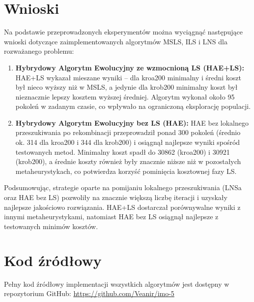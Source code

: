 \documentclass[12pt,a4paper]{article}
\begin{document}
\section{Wnioski}
Na podstawie przeprowadzonych eksperymentów można wyciągnąć następujące wnioski dotyczące zaimplementowanych algorytmów MSLS, ILS i LNS dla rozważanego problemu:

\begin{enumerate}
    \item \textbf{Hybrydowy Algorytm Ewolucyjny ze wzmocnioną LS (HAE+LS):} HAE+LS wykazał mieszane wyniki – dla kroa200 minimalny i średni koszt był nieco wyższy niż w MSLS, a jedynie dla krob200 minimalny koszt był nieznacznie lepszy kosztem wyższej średniej. Algorytm wykonał około 95 pokoleń w zadanym czasie, co wpływało na ograniczoną eksplorację populacji.
    \item \textbf{Hybrydowy Algorytm Ewolucyjny bez LS (HAE):} HAE bez lokalnego przeszukiwania po rekombinacji przeprowadził ponad 300 pokoleń (średnio ok. 314 dla kroa200 i 344 dla krob200) i osiągnął najlepsze wyniki spośród testowanych metod. Minimalny koszt spadł do 30862 (kroa200) i 30921 (krob200), a średnie koszty również były znacznie niższe niż w pozostałych metaheurystykach, co potwierdza korzyść pominięcia kosztownej fazy LS.
\end{enumerate}

Podsumowując, strategie oparte na pomijaniu lokalnego przeszukiwania (LNSa oraz HAE bez LS) pozwoliły na znacznie większą liczbę iteracji i uzyskały najlepsze jakościowo rozwiązania. HAE+LS dostarczał porównywalne wyniki z innymi metaheurystykami, natomiast HAE bez LS osiągnął najlepsze z testowanych minimów kosztów.

\section{Kod źródłowy}
Pełny kod źródłowy implementacji wszystkich algorytmów jest dostępny w repozytorium GitHub:
\url{https://github.com/Veanir/imo-5}
\end{document}
